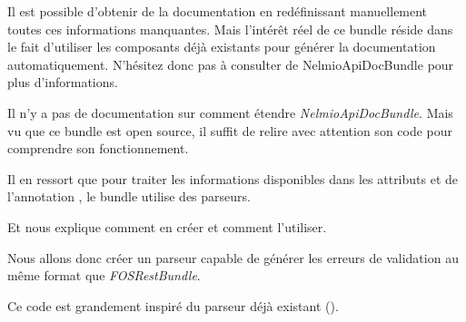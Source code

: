 \documentclass[big]{zmdocument}
\begin{document}
\begin{Information}
Il est possible d'obtenir de la documentation en redéfinissant manuellement toutes ces informations manquantes. Mais l'intérêt réel de ce bundle réside dans le fait d'utiliser les composants déjà existants pour générer la documentation automatiquement. N'hésitez donc pas à consulter  de NelmioApiDocBundle pour plus d'informations.
\end{Information}




Il n'y a pas de documentation sur comment étendre \textit{NelmioApiDocBundle}. Mais vu que ce bundle est open source, il suffit de relire avec attention son code pour comprendre son fonctionnement.



Il en ressort que pour traiter les informations disponibles dans les attributs  et  de l'annotation , le bundle utilise des parseurs.



Et  nous explique comment en créer et comment l'utiliser.



Nous allons donc créer un parseur capable de générer les erreurs de validation au même format que \textit{FOSRestBundle}.



Ce code est grandement inspiré du parseur déjà existant ().
\end{document}
